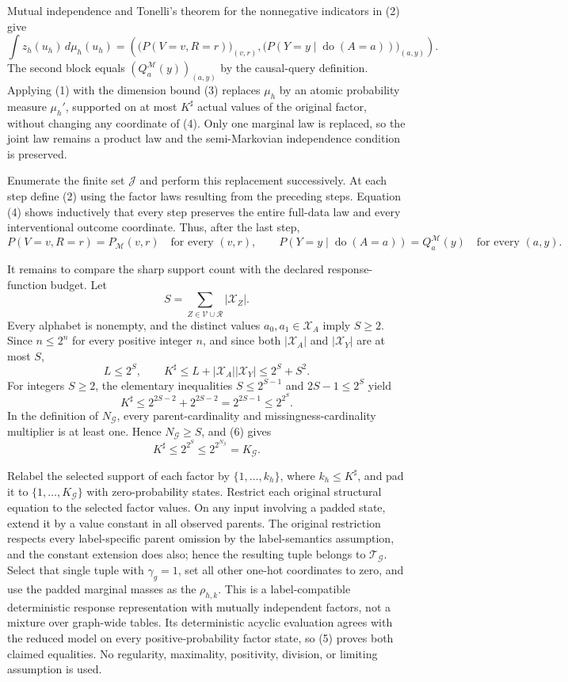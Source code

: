 Mutual independence and Tonelli's theorem for the nonnegative indicators in (2) give
\[
 \int z_h(u_h)\,d\mu_h(u_h)
 =\left(
   \bigl(P(V=v,R=r)\bigr)_{(v,r)},
   \bigl(P(Y=y\mid\operatorname{do}(A=a))\bigr)_{(a,y)}
 \right).
 \tag{4}
\]
The second block equals \((Q_a^{\mathcal M}(y))_{(a,y)}\) by the causal-query definition.  Applying (1) with the dimension bound (3) replaces \(\mu_h\) by an atomic probability measure \(\mu_h'\), supported on at most \(K^{\sharp}\) actual values of the original factor, without changing any coordinate of (4).  Only one marginal law is replaced, so the joint law remains a product law and the semi-Markovian independence condition is preserved.

Enumerate the finite set \(\mathcal J\) and perform this replacement successively.  At each step define (2) using the factor laws resulting from the preceding steps.  Equation (4) shows inductively that every step preserves the entire full-data law and every interventional outcome coordinate.  Thus, after the last step,
\[
 P(V=v,R=r)=P_{\mathcal M}(v,r)
 \quad\text{for every }(v,r),
 \qquad
 P(Y=y\mid\operatorname{do}(A=a))=Q_a^{\mathcal M}(y)
 \quad\text{for every }(a,y).
 \tag{5}
\]

It remains to compare the sharp support count with the declared response-function budget.  Let
\[
 S=\sum_{Z\in\mathcal V\cup\mathcal R}|\mathcal X_Z|.
\]
Every alphabet is nonempty, and the distinct values \(a_0,a_1\in\mathcal X_A\) imply \(S\geq2\).  Since \(n\leq2^n\) for every positive integer \(n\), and since both \(|\mathcal X_A|\) and \(|\mathcal X_Y|\) are at most \(S\),
\[
 L\leq2^S,
 \qquad
 K^{\sharp}\leq L+|\mathcal X_A||\mathcal X_Y|
 \leq2^S+S^2.
\]
For integers \(S\geq2\), the elementary inequalities \(S\leq2^{S-1}\) and \(2S-1\leq2^S\) yield
\[
 K^{\sharp}
 \leq2^{2S-2}+2^{2S-2}
 =2^{2S-1}
 \leq2^{2^S}.
 \tag{6}
\]
In the definition of \(N_{\mathcal G}\), every parent-cardinality and missingness-cardinality multiplier is at least one.  Hence \(N_{\mathcal G}\geq S\), and (6) gives
\[
 K^{\sharp}\leq2^{2^S}\leq2^{2^{N_{\mathcal G}}}=K_{\mathcal G}.
 \tag{7}
\]

Relabel the selected support of each factor by \(\{1,\ldots,k_h\}\), where \(k_h\leq K^{\sharp}\), and pad it to \(\{1,\ldots,K_{\mathcal G}\}\) with zero-probability states.  Restrict each original structural equation to the selected factor values.  On any input involving a padded state, extend it by a value constant in all observed parents.  The original restriction respects every label-specific parent omission by the label-semantics assumption, and the constant extension does also; hence the resulting tuple belongs to \(\mathcal T_{\mathcal G}\).  Select that single tuple with \(\gamma_g=1\), set all other one-hot coordinates to zero, and use the padded marginal masses as the \(\rho_{h,k}\).  This is a label-compatible deterministic response representation with mutually independent factors, not a mixture over graph-wide tables.  Its deterministic acyclic evaluation agrees with the reduced model on every positive-probability factor state, so (5) proves both claimed equalities.  No regularity, maximality, positivity, division, or limiting assumption is used.